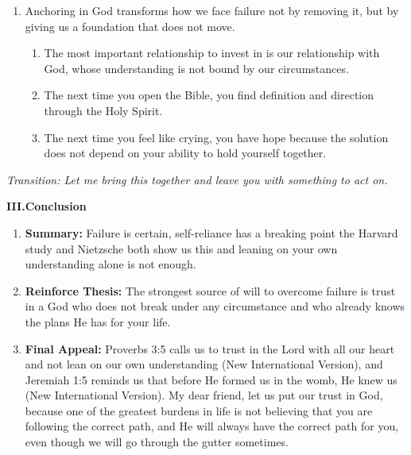 \documentclass[12pt]{article}
\begin{document}
\begin{enumerate}[label=\Alph*., leftmargin=1.5cm, itemsep=0pt]
  \item Anchoring in God transforms how we face failure not by removing it, but by giving us a foundation that does not move.
    \begin{enumerate}[label=\arabic*., leftmargin=1cm, itemsep=0pt]
      \item The most important relationship to invest in is our relationship with God, whose understanding is not bound by our circumstances.
      \item The next time you open the Bible, you find definition and direction through the Holy Spirit.
      \item The next time you feel like crying, you have hope because the solution does not depend on your ability to hold yourself together.
    \end{enumerate}

\end{enumerate}

\noindent\textit{Transition: Let me bring this together and leave you with something to act on.}

\bigskip

\noindent\textbf{III.\quad Conclusion}

\begin{enumerate}[label=\Alph*., leftmargin=1.5cm, itemsep=0pt]

  \item \textbf{Summary:} Failure is certain, self-reliance has a breaking point the Harvard study and Nietzsche both show us this and leaning on your own understanding alone is not enough.

  \item \textbf{Reinforce Thesis:} The strongest source of will to overcome failure is trust in a God who does not break under any circumstance and who already knows the plans He has for your life.

  \item \textbf{Final Appeal:} Proverbs 3:5 calls us to trust in the Lord with all our heart and not lean on our own understanding (New International Version), and Jeremiah 1:5 reminds us that before He formed us in the womb, He knew us (New International Version). My dear friend, let us put our trust in God, because one of the greatest burdens in life is not believing that you are following the correct path, and He will always have the correct path for you, even though we will go through the gutter sometimes.

\end{enumerate}
\end{document}
